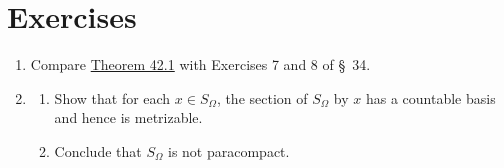 \section*{Exercises}
\begin{enumerate}[itemsep=0.4em, parsep=0pt, topsep=0pt, partopsep=0pt, leftmargin=*, label=\arabic*., ref=\arabic*]
\item Compare \hyperref[thm:42.1]{Theorem 42.1} with Exercises 7 and 8 of \S\ 34.
\item
 \begin{enumerate}[itemsep=0.2em, parsep=0pt, topsep=0pt, partopsep=0pt, leftmargin=*, label=(\alph*), align=left]
 \item Show that for each \(x \in {S}_{\Omega }\), the section of \(S_{\Omega }\) by \(x\) has a countable basis and hence is metrizable.

 \item Conclude that \(S_{\Omega }\) is not paracompact.
 \end{enumerate}
\end{enumerate}